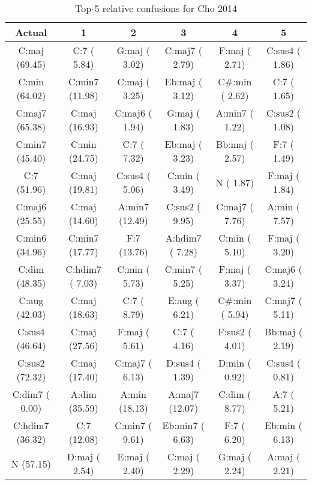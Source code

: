 \begin{table}[h]
\begin{center}
\begin{scriptsize}
\caption{Top-5 relative confusions for Cho 2014}
\label{tab:baseline_confs}
\begin{tabular}{c || c | c | c | c | c |}
\hline
Actual & 1 & 2 & 3 & 4 & 5 \\
\hline
C:maj (69.45) &    C:7 ( 5.84) &   G:maj ( 3.02) &  C:maj7 ( 2.79) &   F:maj ( 2.71) &  C:sus4 ( 1.86) \\
  C:min (64.02) & C:min7 (11.98) &   C:maj ( 3.25) &  Eb:maj ( 3.12) &  C\#:min ( 2.62) &     C:7 ( 1.65) \\
 C:maj7 (65.38) &  C:maj (16.93) &  C:maj6 ( 1.94) &   G:maj ( 1.83) &  A:min7 ( 1.22) &  C:sus2 ( 1.08) \\
 C:min7 (45.40) &  C:min (24.75) &     C:7 ( 7.32) &  Eb:maj ( 3.23) &  Bb:maj ( 2.57) &     F:7 ( 1.49) \\
    C:7 (51.96) &  C:maj (19.81) &  C:sus4 ( 5.06) &   C:min ( 3.49) &       N ( 1.87) &   F:maj ( 1.84) \\
\hline
 C:maj6 (25.55) &  C:maj (14.60) &  A:min7 (12.49) &  C:sus2 ( 9.95) &  C:maj7 ( 7.76) &   A:min ( 7.57) \\
 C:min6 (34.96) & C:min7 (17.77) &     F:7 (13.76) & A:hdim7 ( 7.28) &   C:min ( 5.10) &   F:maj ( 3.20) \\
  C:dim (48.35) & C:hdim7 ( 7.03) &   C:min ( 5.73) &  C:min7 ( 5.25) &   F:maj ( 3.37) &  C:maj6 ( 3.24) \\
  C:aug (42.03) &  C:maj (18.63) &     C:7 ( 8.79) &   E:aug ( 6.21) &  C\#:min ( 5.94) &  C:maj7 ( 5.11) \\
 C:sus4 (46.64) &  C:maj (27.56) &   F:maj ( 5.61) &     C:7 ( 4.16) &  F:sus2 ( 4.01) &  Bb:maj ( 2.19) \\
 C:sus2 (72.32) &  C:maj (17.40) &  C:maj7 ( 6.13) &  D:sus4 ( 1.39) &   D:min ( 0.92) &  C:sus4 ( 0.81) \\
 C:dim7 ( 0.00) &  A:dim (35.59) &   A:min (18.13) &  A:maj7 (12.07) &   C:dim ( 8.77) &     A:7 ( 5.21) \\
C:hdim7 (36.32) &    C:7 (12.08) &  C:min7 ( 9.61) & Eb:min7 ( 6.63) &     F:7 ( 6.20) &  Eb:min ( 6.13) \\
\hline
      N (57.15) &  D:maj ( 2.54) &   E:maj ( 2.40) &   C:maj ( 2.29) &   G:maj ( 2.24) &   A:maj ( 2.21) \\
\hline
\end{tabular}
\end{scriptsize}
\end{center}
\end{table}


